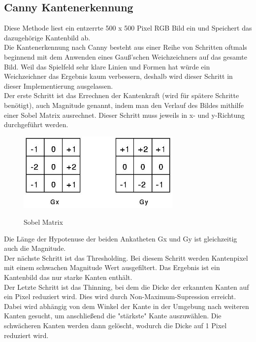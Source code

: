 \documentclass[paper=A4, deutsch]{scrartcl}
\begin{document}
\subsection{Canny Kantenerkennung}
Diese Methode liest ein entzerrte 500 x 500 Pixel RGB Bild ein und Speichert das dazugehörige Kantenbild ab.\\
Die Kantenerkennung nach Canny besteht aus einer Reihe von Schritten oftmals beginnend mit dem Anwenden eines Gauß’schen Weichzeichners auf das gesamte Bild. Weil das Spielfeld sehr klare Linien und Formen hat würde ein Weichzeichner das Ergebnis kaum verbessern, deshalb wird dieser Schritt in dieser Implementierung ausgelassen.\\
Der erste Schritt ist das Errechnen der Kantenkraft (wird für spätere Schritte benötigt), auch Magnitude genannt, indem man den Verlauf des Bildes mithilfe einer Sobel Matrix ausrechnet. Dieser Schritt muss jeweils in x- und y-Richtung durchgeführt werden.\\ 

\begin{figure}[ht]
	\centering
		\includegraphics[width=8cm]{Sobel.png}\\
	\caption[Sobel Matrix]{Sobel Matrix}
	\label{fig:nettop}
\end{figure}

Die Länge der Hypotenuse der beiden Ankatheten Gx und Gy ist gleichzeitig auch die Magnitude.\\
Der nächste Schritt ist das Thresholding. Bei diesem Schritt werden Kantenpixel mit einem schwachen Magnitude Wert ausgefiltert. Das Ergebnis ist ein Kantenbild das nur starke Kanten enthält.\\
Der Letzte Schritt ist das Thinning, bei dem die Dicke der erkannten Kanten auf ein Pixel reduziert wird. Dies wird durch Non-Maximum-Supression erreicht. Dabei wird abhängig von dem Winkel der Kante in der Umgebung nach weiteren Kanten gesucht, um anschließend die "stärkste" Kante auszuwählen. Die schwächeren Kanten werden dann gelöscht, wodurch die Dicke auf 1 Pixel reduziert wird.\\
\end{document}
